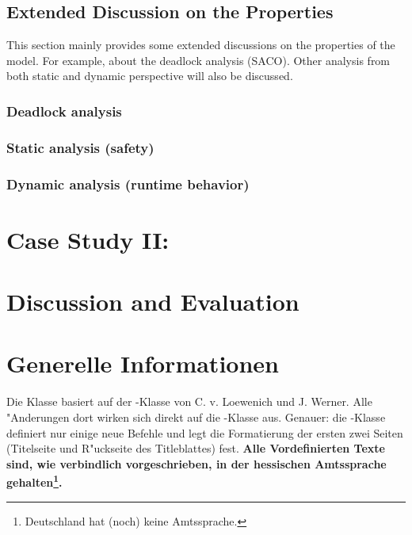 \documentclass[article,dr=phil,type=drfinal,colorback,accentcolor=tud9c]{tudthesis}
\begin{document}
  \subsection{Extended Discussion on the Properties}
  
  This section mainly provides some extended discussions on the properties of the model. For example, about the deadlock analysis (SACO). Other analysis from both static and dynamic perspective will also be discussed.
  
  \subsubsection{Deadlock analysis}
  
  
  
  \subsubsection{Static analysis (safety)}
  
  
  
  \subsubsection{Dynamic analysis (runtime behavior)}
  
  
  
  
  
  \section{Case Study II: }
  
  \section{Discussion and Evaluation}














  \section{Generelle Informationen}
    Die Klasse basiert auf der -Klasse von C. v. Loewenich und
    J. Werner. Alle "Anderungen dort wirken sich direkt auf die
    -Klasse aus. Genauer: die -Klasse definiert nur einige
    neue Befehle und legt die Formatierung der ersten zwei Seiten (Titelseite
    und R"uckseite des Titleblattes) fest. \textbf{Alle Vordefinierten Texte sind, wie verbindlich vorgeschrieben, in der hessischen Amtssprache
    gehalten\footnote{Deutschland hat (noch) keine Amtssprache.}.}
\end{document}
